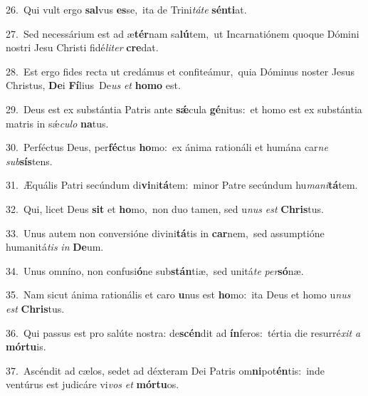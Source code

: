{\numbfont\textcolor{\numbcolor}{26.}}~Qui vult ergo \textbf{sal}\-vus \textbf{es}\-se,~\star ita de Trini\-\textit{tá}\-\textit{te} \textbf{sén}\-\textbf{ti}at.\par
{\numbfont\textcolor{\numbcolor}{27.}}~Sed necessárium est ad æ\-\textbf{tér}\-nam sa\-\textbf{lú}\-tem,~\star ut Incarnatiónem quoque Dómini nostri Jesu Christi fidé\-\textit{li}\-\textit{ter} \textbf{cre}\-dat.\par
{\numbfont\textcolor{\numbcolor}{28.}}~Est ergo fides recta ut credámus et confiteámur,~\dagger quia Dóminus noster Jesus Christus, \textbf{De}\-i \textbf{Fí}\-lius~\star De\textit{us} \textit{et} \textbf{ho}\-\textbf{mo} est.\par
{\numbfont\textcolor{\numbcolor}{29.}}~Deus est ex substántia Patris ante \textbf{sǽ}\-cula \textbf{gé}\-nitus:~\star et homo est ex substántia matris in sǽ\-\textit{cu}\-\textit{lo} \textbf{na}\-tus.\par
{\numbfont\textcolor{\numbcolor}{30.}}~Perféctus Deus, per\-\textbf{féc}\-tus \textbf{ho}\-mo:~\star ex ánima rationáli et humána car\textit{ne} \textit{sub}\-\textbf{sís}tens.\par
{\numbfont\textcolor{\numbcolor}{31.}}~Æquális Patri secúndum di\-\textbf{vi}\-ni\-\textbf{tá}\-tem:~\star minor Patre secúndum hu\-\textit{ma}\-\textit{ni}\textbf{tá}tem.\par
{\numbfont\textcolor{\numbcolor}{32.}}~Qui, licet Deus \textbf{sit} et \textbf{ho}\-mo,~\star non duo tamen, sed u\textit{nus} \textit{est} \textbf{Chris}\-tus.\par
{\numbfont\textcolor{\numbcolor}{33.}}~Unus autem non conversióne divini\-\textbf{tá}\-tis in \textbf{car}\-nem,~\star sed assumptióne humanitá\textit{tis} \textit{in} \textbf{De}\-um.\par
{\numbfont\textcolor{\numbcolor}{34.}}~Unus omníno, non confusi\-\textbf{ó}\-ne sub\-\textbf{stán}\-tiæ,~\star sed unitá\textit{te} \textit{per}\-\textbf{só}næ.\par
{\numbfont\textcolor{\numbcolor}{35.}}~Nam sicut ánima rationális et caro \textbf{u}\-nus est \textbf{ho}\-mo:~\star ita Deus et homo u\textit{nus} \textit{est} \textbf{Chris}\-tus.\par
{\numbfont\textcolor{\numbcolor}{36.}}~Qui passus est pro salúte nostra: de\-\textbf{scén}\-dit ad \textbf{ín}\-feros:~\star tértia die resurré\textit{xit} \textit{a} \textbf{mór}\-\textbf{tu}is.\par
{\numbfont\textcolor{\numbcolor}{37.}}~Ascéndit ad cælos, sedet ad déxteram Dei Patris om\-\textbf{ni}\-pot\-\textbf{én}\-tis:~\star inde ventúrus est judicáre vi\textit{vos} \textit{et} \textbf{mór}\-\textbf{tu}os.\par
